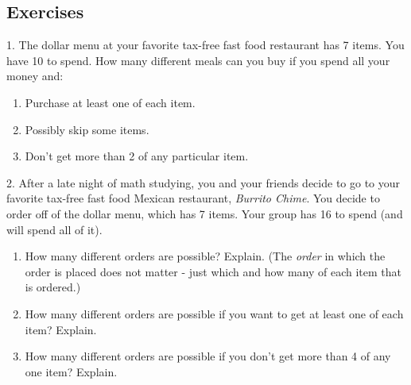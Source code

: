 \documentclass[10pt,]{book}
\theoremstyle{plain}
\theoremstyle{definition}
\numberwithin{equation}{chapter}
\begin{document}
\subsection[Exercises]{Exercises}\label{exercises_counting-advPIE}
\begin{exerciselist}
\item[1.]\hypertarget{exercise-106}{}
            The dollar menu at your favorite tax-free fast food restaurant has 7 items. You have
            \textdollar{}10 to spend. How many different meals can you buy if you spend all your money and:
          \leavevmode%
\begin{enumerate}[label=(\alph*)]
\item\hypertarget{li-354}{}
                Purchase at least one of each item.
\item\hypertarget{li-355}{}
                Possibly skip some items.
\item\hypertarget{li-356}{}
                Don't get more than 2 of any particular item.
\end{enumerate}

\par\smallskip
\item[2.]\hypertarget{exercise-107}{}
                  After a late night of math studying, you and your friends decide to go to your favorite tax-free fast food Mexican restaurant, \emph{Burrito Chime}. You decide to order off of the dollar menu, which has 7 items. Your group has
                  \textdollar{}16 to spend (and will spend all of it).
                \leavevmode%
\begin{enumerate}[label=(\alph*)]
\item\hypertarget{li-360}{}
                      How many different orders are possible? Explain. (The \emph{order} in which the order is placed does not matter - just which and how many of each item that is ordered.)


\item\hypertarget{li-361}{}
                      How many different orders are possible if you want to get at least one of each item? Explain.


\item\hypertarget{li-362}{}
                      How many different orders are possible if you don't get more than 4 of any one item? Explain.

\end{enumerate}


\end{exerciselist}
\end{document}
